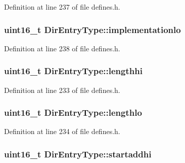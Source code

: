 Definition at line 237 of file defines.\+h.

\subsubsection[{\texorpdfstring{implementationlo}{implementationlo}}]{\setlength{\rightskip}{0pt plus 5cm}uint16\+\_\+t Dir\+Entry\+Type\+::implementationlo}\hypertarget{structDirEntryType_a8164d577c06fb7c312aaa4955d491449}{}\label{structDirEntryType_a8164d577c06fb7c312aaa4955d491449}


Definition at line 238 of file defines.\+h.

\subsubsection[{\texorpdfstring{lengthhi}{lengthhi}}]{\setlength{\rightskip}{0pt plus 5cm}uint16\+\_\+t Dir\+Entry\+Type\+::lengthhi}\hypertarget{structDirEntryType_ad7aaba7b01038bc8bacb096bd66fff08}{}\label{structDirEntryType_ad7aaba7b01038bc8bacb096bd66fff08}


Definition at line 233 of file defines.\+h.

\subsubsection[{\texorpdfstring{lengthlo}{lengthlo}}]{\setlength{\rightskip}{0pt plus 5cm}uint16\+\_\+t Dir\+Entry\+Type\+::lengthlo}\hypertarget{structDirEntryType_ad1cde25a0229866557cd5983c27fbd31}{}\label{structDirEntryType_ad1cde25a0229866557cd5983c27fbd31}


Definition at line 234 of file defines.\+h.

\subsubsection[{\texorpdfstring{startaddhi}{startaddhi}}]{\setlength{\rightskip}{0pt plus 5cm}uint16\+\_\+t Dir\+Entry\+Type\+::startaddhi}\hypertarget{structDirEntryType_a0cab2915e9f864e25b24d298c36c11db}{}\label{structDirEntryType_a0cab2915e9f864e25b24d298c36c11db}


